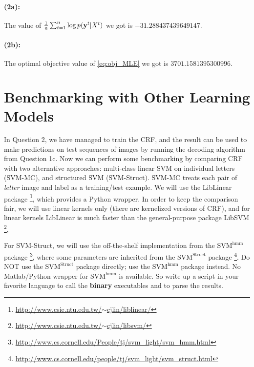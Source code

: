 \documentclass[11pt]{report}
\begin{document}
\paragraph{(2a):} The value of $\frac{1}{n} \sum_{t=1}^n \log p(\mathbf{\boldsymbol{y}}^t | X^t)$ we got is $-31.288437439649147$.
\paragraph{(2b):} The optimal objective value of \eqref{eq:obj_MLE} we got is $3701.1581395300996$.

\section{Benchmarking with Other Learning Models}

In Question 2, we have managed to train the CRF,
and the result can be used to make predictions on test sequences of images by running the decoding algorithm from Question 1c. 
Now we can perform some benchmarking by comparing CRF with two alternative approaches:
multi-class linear SVM on individual letters (SVM-MC),
and structured SVM (SVM-Struct).
SVM-MC treats each pair of \emph{letter} image and label as a training/test example.
We will use the LibLinear package%
\footnote{\href{http://www.csie.ntu.edu.tw/~cjlin/liblinear/}{http://www.csie.ntu.edu.tw/$\sim$cjlin/liblinear/}},
which provides a Python wrapper.
In order to keep the comparison fair,
we will use linear kernels only (there are kernelized versions of CRF),
and for linear kernels LibLinear is much faster than the general-purpose package LibSVM%
\footnote{\href{http://www.csie.ntu.edu.tw/~cjlin/libsvm/}{http://www.csie.ntu.edu.tw/$\sim$cjlin/libsvm/}},


For SVM-Struct, we will use the off-the-shelf implementation from the $\text{SVM}^{\text{hmm}}$ package%
\footnote{\href{http://www.cs.cornell.edu/People/tj/svm_light/svm_hmm.html}{http://www.cs.cornell.edu/People/tj/svm\_light/svm\_hmm.html}},
where some parameters are inherited from the $\text{SVM}^{\text{Struct}}$ package%
\footnote{\href{http://www.cs.cornell.edu/people/tj/svm_light/svm_struct.html}{http://www.cs.cornell.edu/people/tj/svm\_light/svm\_struct.html}}.
Do NOT use the $\text{SVM}^{\text{Struct}}$ package directly; 
use the $\text{SVM}^{\text{hmm}}$ package instead.
No Matlab/Python wrapper for $\text{SVM}^{\text{hmm}}$ is available.
So write up a script in your favorite language to call the \textbf{binary} executables and to parse the results.
\end{document}
